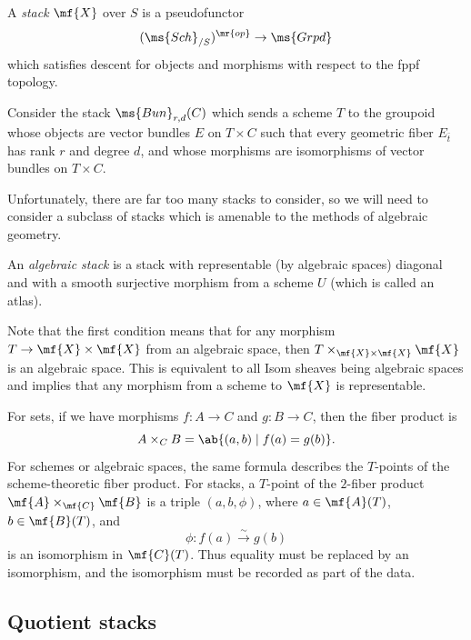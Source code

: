 \begin{defn}[informal]
    A \textit{stack} \(\mf{X}\) over \(S\) is a pseudofunctor
    \[ (\ms{Sch}_{/S})^{\mr{op}} \to \ms{Grpd} \]
    which satisfies descent for objects and morphisms with respect to the fppf topology.
\end{defn}

\begin{exm}
    Consider the stack \(\ms{Bun}_{r,d}(C)\) which sends a scheme \(T\) to the groupoid whose objects are vector bundles \(E\) on \(T\times C\) such that every geometric fiber \(E_{\bar t}\) has rank \(r\) and degree \(d\), and whose morphisms are isomorphisms of vector bundles on \(T\times C\).
\end{exm}

Unfortunately, there are far too many stacks to consider, so we will need to consider a subclass of stacks which is amenable to the methods of algebraic geometry.

\begin{defn}
    An \textit{algebraic stack} is a stack with representable (by algebraic spaces) diagonal and with a smooth surjective morphism from a scheme \(U\) (which is called an atlas). 
\end{defn}

Note that the first condition means that for any morphism \(T \to \mf{X} \times \mf{X}\) from an algebraic space, then \(T \times_{\mf{X} \times \mf{X}} \mf{X}\) is an algebraic space. This is equivalent to all Isom sheaves being algebraic spaces and implies that any morphism from a scheme to \(\mf{X}\) is representable.

\begin{rmk}
    For sets, if we have morphisms \(f\colon A\to C\) and \(g\colon B\to C\), then the fiber product is
    \[ 
        A\times_C B=\ab\{(a,b)\mid f(a)=g(b)\}. 
    \] 
    For schemes or algebraic spaces, the same formula describes the \(T\)-points of the scheme-theoretic fiber product. For stacks, a \(T\)-point of the \(2\)-fiber product \(\mf{A}\times_{\mf{C}}\mf{B}\) is a triple \((a,b,\phi)\), where \(a\in\mf{A}(T)\), \(b\in\mf{B}(T)\), and
    \[ 
        \phi\colon f(a)\xrightarrow{\sim}g(b) 
    \]
    is an isomorphism in \(\mf{C}(T)\). Thus equality must be replaced by an isomorphism, and the isomorphism must be recorded as part of the data.
\end{rmk}


\subsection{Quotient stacks}%
\label{sub:Quotient stacks}

